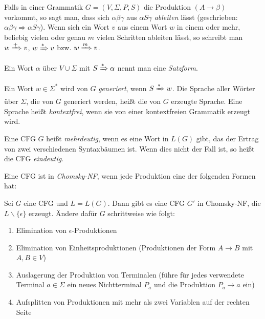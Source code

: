 \documentclass{cheat-sheet}
\begin{document}
\begin{defn}
Falls in einer Grammatik $G = (V, \Sigma, P, S)$ die Produktion $(A \longrightarrow \beta)$ vorkommt, so sagt man, dass sich $\alpha \beta \gamma$ aus $\alpha S \gamma$ \emph{ableiten} lässt (geschrieben: $\alpha \beta \gamma \Rightarrow \alpha S \gamma $). Wenn sich ein Wort $v$ aus einem Wort $w$ in einem oder mehr, beliebig vielen oder genau $m$ vielen Schritten ableiten lässt, so schreibt man $w \xRightarrow{+} v$, $w \xRightarrow{*} v$ bzw. $w \xRightarrow{m} v$.
\end{defn}

\begin{defn}
Ein Wort $\alpha$ über $V \cup \Sigma$ mit $S \xRightarrow{*} \alpha$ nennt man eine \emph{Satzform}.
\end{defn}

\begin{defn}
Ein Wort $w \in \Sigma^{*}$ wird von $G$ \emph{generiert}, wenn $S \xRightarrow[]{*} w$. Die Sprache aller Wörter über $\Sigma$, die von $G$ generiert werden, heißt die von $G$ erzeugte Sprache. Eine Sprache heißt \emph{kontextfrei}, wenn sie von einer kontextfreien Grammatik erzeugt wird.
\end{defn}


\begin{defn}
  Eine CFG $G$ heißt \emph{mehrdeutig}, wenn es eine Wort in $L(G)$ gibt, das der Ertrag von zwei verschiedenen Syntaxbäumen ist. Wenn dies nicht der Fall ist, so heißt die CFG \emph{eindeutig}.
\end{defn}

\begin{defn}
  Eine CFG ist in \emph{Chomsky-NF}, wenn jede Produktion eine der folgenden Formen hat:
  \begin{itemize}
  \end{itemize}
\end{defn}

\begin{alg}
Sei $G$ eine CFG und $L = L(G)$. Dann gibt es eine CFG $G'$ in Chomsky-NF, die $L \backslash \{ \epsilon \}$ erzeugt. Ändere dafür $G$ schrittweise wie folgt:
\end{alg}

\begin{enumerate}
  \item Elimination von $\epsilon$-Produktionen
  \item Elimination von Einheitsproduktionen (Produktionen der Form $A \longrightarrow B$ mit $A, B \in V$)
  \item Auslagerung der Produktion von Terminalen (führe für jedes verwendete Terminal $a \in \Sigma$ ein neues Nichtterminal $P_{a}$ und die Produktion $P_{a} \longrightarrow a$ ein)
  \item Aufsplitten von Produktionen mit mehr als zwei Variablen auf der rechten Seite
\end{enumerate}
\end{document}
